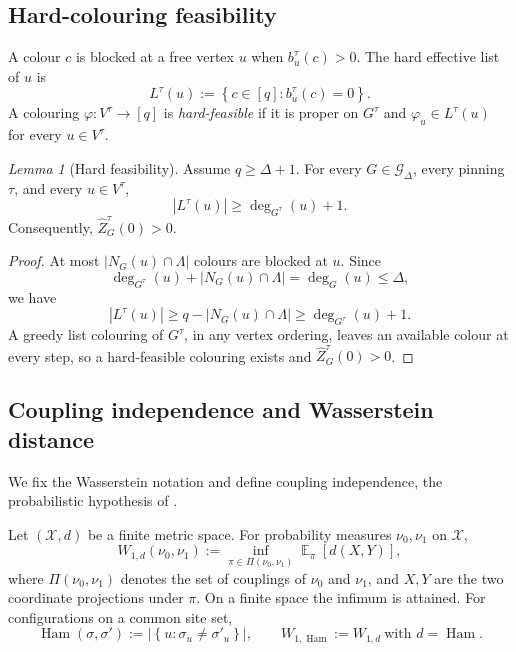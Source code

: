 \documentclass[11pt,reqno]{article}
\theoremstyle{plain}
\newtheorem{lemma}[theorem]{Lemma}
\theoremstyle{definition}
\theoremstyle{remark}
\newtheorem{lemma}[lemma]{Lemma}
\theoremstyle{definition}
\theoremstyle{remark}
\newcommand{\abs}[1]{\left|#1\right|}
\newcommand{\set}[1]{\left\{#1\right\}}
\DeclareMathOperator{\E}{\mathbb{E}}
\DeclareMathOperator{\Ham}{Ham}
\newcommand{\Deg}{\Delta}                        %
\newcommand{\Wd}{W_{1,d}}                        %
\newcommand{\WHam}{W_{1,\Ham}}                   %
\newcommand{\colours}{[q]}                        %
\newcommand{\bcount}{b}
\newcommand{\Gdeg}{\mathcal{G}_{\Deg}}
\newcommand{\nZpin}[2]{\widehat Z_{#1}^{#2}}
\newcommand{\hardlist}[2]{L^{#1}(#2)}
\begin{document}
\subsection{Hard-colouring feasibility}
A colour \(c\) is blocked at a free vertex \(u\) when
\(\bcount_u^\tau(c)>0\).  The hard effective list of \(u\) is
\[
  \hardlist{\tau}{u}:=\set{c\in\colours:\bcount_u^\tau(c)=0}.
\]
A colouring \(\varphi\colon V^\tau\to\colours\) is \emph{hard-feasible}
if it is proper on \(G^\tau\) and
\(\varphi_u\in\hardlist{\tau}{u}\) for every \(u\in V^\tau\).

\begin{lemma}[Hard feasibility]\label{lem:hard-feas}
Assume \(q\ge\Deg+1\).  For every \(G\in\Gdeg\), every pinning \(\tau\),
and every \(u\in V^\tau\),
\[
  \abs{\hardlist{\tau}{u}}
  \ge \deg_{G^\tau}(u)+1.
\]
Consequently, \(\nZpin{G}{\tau}(0)>0\).
\end{lemma}

\begin{proof}
At most \(\abs{N_G(u)\cap\Lambda}\) colours are blocked at \(u\).  Since
\[
  \deg_{G^\tau}(u)+\abs{N_G(u)\cap\Lambda}
  =\deg_G(u)\le\Deg,
\]
we have
\[
  \abs{\hardlist{\tau}{u}}
  \ge q-\abs{N_G(u)\cap\Lambda}
  \ge \deg_{G^\tau}(u)+1.
\]
A greedy list colouring of \(G^\tau\), in any vertex ordering, leaves an
available colour at every step, so a hard-feasible colouring exists and
\(\nZpin{G}{\tau}(0)>0\).
\end{proof}

\subsection{Coupling independence and Wasserstein distance}

We fix the Wasserstein notation and define coupling independence, the
probabilistic hypothesis of .

Let $(\mathcal{X},d)$ be a finite metric space. For probability measures
$\nu_0,\nu_1$ on $\mathcal{X}$,
\begin{equation}\label{eq:W1def}
  \Wd(\nu_0,\nu_1) := \inf_{\pi\in\Pi(\nu_0,\nu_1)} \E_{\pi}[d(X,Y)],
\end{equation}
where $\Pi(\nu_0,\nu_1)$ denotes the set of couplings of $\nu_0$ and $\nu_1$,
and \(X,Y\) are the two coordinate projections under \(\pi\).
On a finite space the infimum is attained.
For configurations on a common site set,
\[
  \Ham(\sigma,\sigma')
    :=\abs{\set{u:\sigma_u\ne\sigma'_u}},
  \qquad
  \WHam:=\Wd\ \text{with }d=\mathord{\Ham}.
\]
\end{document}
